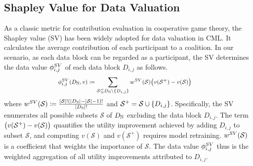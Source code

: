 \subsection{Shapley Value for Data Valuation}
\label{sec:sv}
As a classic metric for contribution evaluation in cooperative game theory, the Shapley value (SV) has been widely adopted for data valuation in CML. 
It calculates the average contribution of each participant to a coalition. 
In our scenario, as each data block can be regarded as a participant, the SV determines the data value $\phi^{SV}_{i,j}$ of each data block $D_{i,j}$ as follows.
\begin{align}
\label{eq:sv}
    &\medmath{\sv_{i,j}(\granddataset, v) \coloneqq \sum_{\mathcal{S}\subseteq \granddataset \setminus \set[D_{i,j}]} \weightsv(\mathcal{S}) \big(v(\splus) - v(\mathcal{S})\big)}
\end{align}
where $w^{SV}(\mathcal{S}) \coloneqq  \frac{|\mathcal{S}|!(|D_{\mathbb{N}}|- |\mathcal{S}| - 1)!}{|D_{\mathbb{N}}|!}$ and $\mathcal{S}^{+} = \mathcal{S} \cup \{D_{i,j}\}$.
Specifically, the SV enumerates all possible subsets $\mathcal{S}$ of $D_{\mathbb{N}}$ excluding the data block $D_{i,j}$.
The term $\big(v(\mathcal{S}^{+}) - v(\mathcal{S})\big)$ quantifies the utility improvement achieved by adding $D_{i,j}$ to subset $\mathcal{S}$, and computing $v(\mathcal{S})$ and $v(\mathcal{S}^+)$ requires model retraining.
$w^{SV}(\mathcal{S})$ is a coefficient that weights the importance of $\mathcal{S}$.
The data value $\phi^{SV}_{i,j}$ thus is the weighted aggregation of all utility improvements attributed to $D_{i,j}$.

